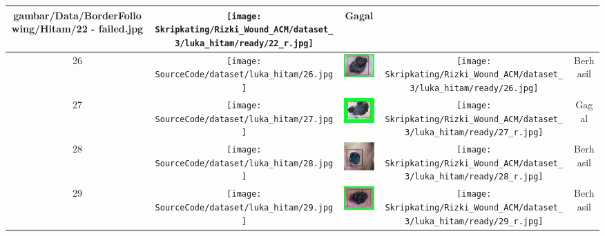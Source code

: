 \begin{longtable}[width = 8cm]{| c | c | c | c | c |}
        {gambar/Data/BorderFollowing/Hitam/22 - failed.jpg} &
        \texttt{[image: Skripkating/Rizki\_Wound\_ACM/dataset\_3/luka\_hitam/ready/22\_r.jpg]} &
        Gagal
        \\
        \hline
        26 &
        \texttt{[image: SourceCode/dataset/luka\_hitam/26.jpg]} &
        \includegraphics[keepaspectratio, width=2cm]
        {gambar/Data/BorderFollowing/Hitam/26 - sukses.jpg} &
        \texttt{[image: Skripkating/Rizki\_Wound\_ACM/dataset\_3/luka\_hitam/ready/26.jpg]} &
        Berhasil
        \\
        \hline
        27 &
        \texttt{[image: SourceCode/dataset/luka\_hitam/27.jpg]} &
        \includegraphics[keepaspectratio, width=2cm]
        {gambar/Data/BorderFollowing/Hitam/27 - failed.jpg} &
        \texttt{[image: Skripkating/Rizki\_Wound\_ACM/dataset\_3/luka\_hitam/ready/27\_r.jpg]} &
        Gagal
        \\
        \hline
        28 &
        \texttt{[image: SourceCode/dataset/luka\_hitam/28.jpg]} &
        \includegraphics[keepaspectratio, width=2cm]
        {gambar/Data/BorderFollowing/Hitam/28 - sukses.jpg} &
        \texttt{[image: Skripkating/Rizki\_Wound\_ACM/dataset\_3/luka\_hitam/ready/28\_r.jpg]} &
        Berhasil
        \\
        \hline
        29 &
        \texttt{[image: SourceCode/dataset/luka\_hitam/29.jpg]} &
        \includegraphics[keepaspectratio, width=2cm]
        {gambar/Data/BorderFollowing/Hitam/29 - sukses.jpg} &
        \texttt{[image: Skripkating/Rizki\_Wound\_ACM/dataset\_3/luka\_hitam/ready/29\_r.jpg]} &
        Berhasil
        \\
        \hline

\end{longtable}
